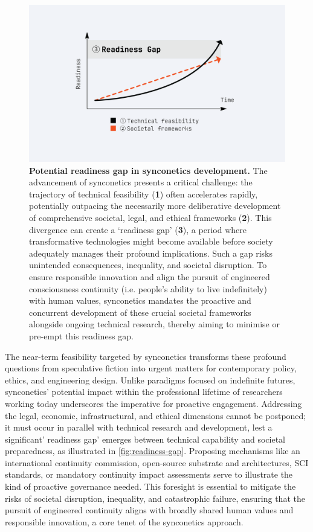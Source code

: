 \documentclass[10pt]{article}
\begin{document}
\begin{sloppypar}
  \begin{figure}[ht!]
    \centering
    \includegraphics[width=\textwidth]{figures/readiness-gap.png}
    \caption[Potential readiness gap in synconetics development]{\textbf{Potential readiness gap in synconetics development.} The advancement of synconetics presents a critical challenge: the trajectory of technical feasibility (\textbf{1}) often accelerates rapidly, potentially outpacing the necessarily more deliberative development of comprehensive societal, legal, and ethical frameworks (\textbf{2}). This divergence can create a ‘readiness gap’ (\textbf{3}), a period where transformative technologies might become available before society adequately manages their profound implications. Such a gap risks unintended consequences, inequality, and societal disruption. To ensure responsible innovation and align the pursuit of engineered consciousness continuity (i.e. people’s ability to live indefinitely) with human values, synconetics mandates the proactive and concurrent development of these crucial societal frameworks alongside ongoing technical research, thereby aiming to minimise or pre-empt this readiness gap.}
    \label{fig:readiness-gap}
  \end{figure}

  The near-term feasibility targeted by synconetics transforms these profound questions from speculative fiction into urgent matters for contemporary policy, ethics, and engineering design. Unlike paradigms focused on indefinite futures, synconetics’ potential impact within the professional lifetime of researchers working today underscores the imperative for proactive engagement. Addressing the legal, economic, infrastructural, and ethical dimensions cannot be postponed; it must occur in parallel with technical research and development, lest a significant’ readiness gap’ emerges between technical capability and societal preparedness, as illustrated in \autoref{fig:readiness-gap}. Proposing mechanisms like an international continuity commission, open-source substrate and architectures, SCI standards, or mandatory continuity impact assessments serve to illustrate the kind of proactive governance needed. This foresight is essential to mitigate the risks of societal disruption, inequality, and catastrophic failure, ensuring that the pursuit of engineered continuity aligns with broadly shared human values and responsible innovation, a core tenet of the synconetics approach.


\end{sloppypar}
\end{document}
